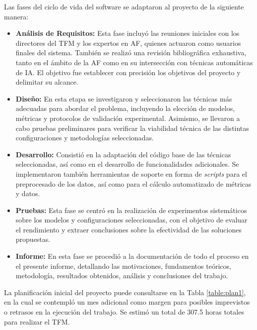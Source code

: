 Las fases del ciclo de vida del software se adaptaron al proyecto de la siguiente manera:

\begin{itemize}
\item \textbf{Análisis de Requisitos:} Esta fase incluyó las reuniones iniciales con los directores del TFM y los expertos en AF, quienes actuaron como usuarios finales del sistema. También se realizó una revisión bibliográfica exhaustiva, tanto en el ámbito de la AF como en su intersección con técnicas automáticas de IA. El objetivo fue establecer con precisión los objetivos del proyecto y delimitar su alcance.

\item \textbf{Diseño:} En esta etapa se investigaron y seleccionaron las técnicas más adecuadas para abordar el problema, incluyendo la elección de modelos, métricas y protocolos de validación experimental. Asimismo, se llevaron a cabo pruebas preliminares para verificar la viabilidad técnica de las distintas configuraciones y metodologías seleccionadas.

\item \textbf{Desarrollo:} Consistió en la adaptación del código base de las técnicas seleccionadas, así como en el desarrollo de funcionalidades adicionales. Se implementaron también herramientas de soporte en forma de \textit{scripts} para el preprocesado de los datos, así como para el cálculo automatizado de métricas y datos.

\item \textbf{Pruebas:} Esta fase se centró en la realización de experimentos sistemáticos sobre los modelos y configuraciones seleccionadas, con el objetivo de evaluar el rendimiento y extraer conclusiones sobre la efectividad de las soluciones propuestas.

\item \textbf{Informe:} En esta fase se procedió a la documentación de todo el proceso en el presente informe, detallando las motivaciones, fundamentos teóricos, metodología, resultados obtenidos, análisis y conclusiones del trabajo.
\end{itemize}

La planificación inicial del proyecto puede consultarse en la Tabla \ref{table:plan1}, en la cual se contempló un mes adicional como margen para posibles imprevistos o retrasos en la ejecución del trabajo. Se estimó un total de 307.5 horas totales para realizar el TFM.

